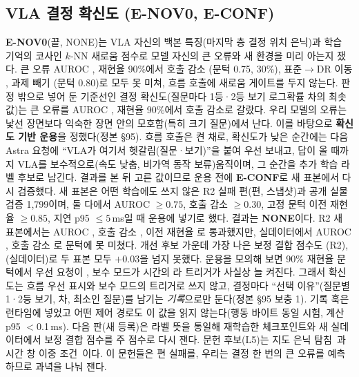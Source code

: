 \subsection{VLA 결정 확신도 (E-NOV0, E-CONF)}
\label{sec:plan_conf}
\textbf{E-NOV0}(끝, NONE)는 VLA 자신의 백본 특징(마지막 층 결정 위치 은닉)과 학습 기억의 코사인 $k$-NN 새로움 점수로 모델 자신의 큰 오류와 새 환경을 미리 아는지 쟀다. 큰 오류 AUROC , 재현율 90\%에서 호출 감소 (문턱 0.75, 30\%), 표준$\rightarrow$DR 이동 , 과제 빼기 (문턱 0.80)로 모두 못 미쳐, 흐름 호출에 새로움 게이트를 두지 않는다. 판정 밖으로 넣어 둔 기준선인 결정 확신도(질문마다 1등·2등 보기 로그확률 차의 최솟값)는 큰 오류를 AUROC , 재현율 90\%에서 호출  감소로 갈랐다. 우리 모델의 오류는 낯선 장면보다 익숙한 장면 안의 모호함(특히 크기 질문)에서 난다. 이를 바탕으로 \textbf{확신도 기반 운용}을 정했다(정본 §95). 흐름 호출은 켠 채로, 확신도가 낮은 순간에는 다음 Astra 요청에 ``VLA가 여기서 헷갈림(질문·보기)''을 붙여 우선 보내고, 답이 올 때까지 VLA를 보수적으로(속도 낮춤, 비가역 동작 보류)움직이며, 그 순간을 추가 학습 라벨 후보로 남긴다. 결과를 본 뒤 고른 값이므로 운용 전에 \textbf{E-CONF}로 새 표본에서 다시 검증했다. 새 표본은 어떤 학습에도 쓰지 않은 R2 실패 편(편,  스냅샷)과 공개 실물 검증 1,799이며, 둘 다에서 AUROC $\ge0.75$, 호출 감소 $\ge0.30$, 고정 문턱 이전 재현율 $\ge0.85$, 지연 p95 $\le5$\,ms일 때 운용에 넣기로 했다. 결과는 \textbf{NONE}이다. R2 새 표본에서는 AUROC , 호출 감소 , 이전 재현율 로 통과했지만, 실데이터에서 AUROC , 호출 감소 로 문턱에 못 미쳤다. 개선 후보 가운데 가장 나은 보정 결합 점수도 (R2), (실데이터)로 두 표본 모두 $+0.03$을 넘지 못했다. 운용을 모의해 보면 90\% 재현율 문턱에서 우선 요청이 , 보수 모드가 시간의 라 트리거가 사실상 늘 켜진다. 그래서 확신도는 흐름 우선 표시와 보수 모드의 트리거로 쓰지 않고, 결정마다 ``선택 이유''(질문별 1·2등 보기, 차, 최소인 질문)를 남기는 \emph{기록}으로만 둔다(정본 §95 보충 1). 기록 훅은 런타임에 넣었고 어떤 제어 경로도 이 값을 읽지 않는다(행동 바이트 동일 시험, 계산 p95 $<$0.1\,ms). 다음 판(새 등록)은 라벨 뜻을 통일해 재학습한 체크포인트와 새 실데이터에서 보정 결합 점수를 주 점수로 다시 잰다. 문헌 후보(L5)는 지도 은닉 탐침~\cite{safe2025}과 시간 창 이중 조건~\cite{fiper2025}이다. 이 문헌들은 편 실패를, 우리는 결정 한 번의 큰 오류를 예측하므로 과녁을 나눠 잰다.

